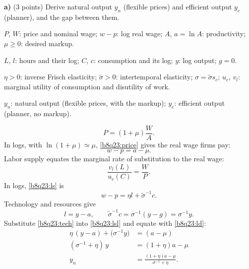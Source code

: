 \textbf{a)} (3 points) Derive natural output $y_n$ (flexible prices) and efficient output $y_e$ (planner), and the gap between them.
\resolespaco
\begin{sol}
\begin{notacao}
\item $P$, $W$: price and nominal wage; $w-p$: log real wage; $A$, $a=\ln A$: productivity; $\mu\ge0$: desired markup.
\item $L$, $l$: hours and their log; $C$, $c$: consumption and its log; $y$: log output; $g=0$.
\item $\eta>0$: inverse Frisch elasticity; $\tilde\sigma>0$: intertemporal elasticity; $\sigma=\tilde\sigma s_c$; $u_c$, $v_l$: marginal utility of consumption and disutility of work.
\item $y_n$: natural output (flexible prices, with the markup); $y_e$: efficient output (planner, no markup).
\end{notacao}
\begin{equation}
P=(1+\mu)\frac WA. \label{b8q23:price}
\end{equation}
In logs, with $\ln(1+\mu)\simeq\mu$, \eqref{b8q23:price} gives the real wage firms pay:
\begin{equation}
w-p=a-\mu. \label{b8q23:ld}
\end{equation}
Labor supply equates the marginal rate of substitution to the real wage:
\begin{equation}
\frac{v_l(L)}{u_c(C)}=\frac WP. \label{b8q23:ls}
\end{equation}
In logs, \eqref{b8q23:ls} is
\begin{equation}
w-p=\eta l+\tilde\sigma^{-1}c. \label{b8q23:lsl}
\end{equation}
Technology and resources give
\begin{equation}
l=y-a,\qquad \tilde\sigma^{-1}c=\sigma^{-1}(y-g)=\sigma^{-1}y. \label{b8q23:tech}
\end{equation}
Substitute \eqref{b8q23:tech} into \eqref{b8q23:lsl} and equate with \eqref{b8q23:ld}:
\begin{align}
\eta\,(y-a)+\big(\sigma^{-1}y\big)&=(a-\mu)\nonumber\\
(\sigma^{-1}+\eta)\,y&=(1+\eta)a-\mu\nonumber\\
y_n&=\frac{(1+\eta)a-\mu}{\sigma^{-1}+\eta}. \label{b8q23:yn}
\end{align}
\begin{equation}

\end{equation}
\end{sol}
